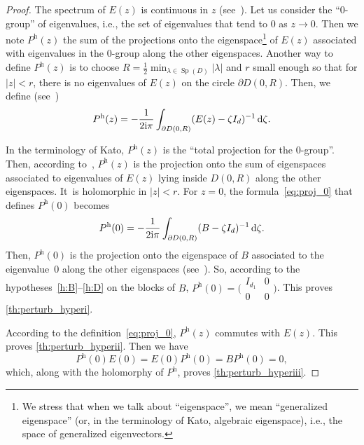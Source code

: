 \documentclass[11pt]{article}
\newcommand{\ie}{i.e.,\xspace}
\theoremstyle{plain}
\theoremstyle{definition}
\theoremstyle{remark}
\DeclareMathOperator{\Sp}{Sp}
\newcommand{\diff}[1][-3]{\ensuremath{\mathop{}\mkern#1mu\mathrm{d}}}
\newcommand{\h}{{\mathrm h}}
\newcommand{\iu}{\mathrm i}
\begin{document}
\begin{proof}
The spectrum of $E(z)$ is continuous in $z$ (see~\cite[Ch.\,II, \S1.2]{kato_1995}). Let us consider the ``$0$-group'' of eigenvalues, \ie the set of eigenvalues that tend to $0$ as $z\to 0$. Then we note $P^\h(z)$ the sum of the projections onto the eigenspace\footnote{We stress that when we talk about ``eigenspace'', we mean ``generalized eigenspace'' (or, in the terminology of Kato, algebraic eigenspace), \ie the space of generalized eigenvectors.} of $E(z)$ associated with eigenvalues in the $0$-group along the other eigenspaces. Another way to define $P^\h(z)$ is to choose $R=\frac12 \min_{\lambda\in\Sp(D)} |\lambda|$ and $r$ small enough so that for $|z|<r$, there is no eigenvalues of $E(z)$ on the circle $\partial D(0,R)$. Then, we define (see~\cite[Ch.\,II, Eq.\,(1.16)]{kato_1995})
\begin{equation}\label{eq:proj_0}
P^\h(z) = -\frac1{2\iu\pi}\int_{\partial D(0,R)} (E(z)-\zeta I_d)^{-1}\diff \zeta.
\end{equation}

In the terminology of Kato, $P^\h(z)$ is the ``total projection for the $0$-group''. Then, according to~\cite[Ch.\,II, \S1.4]{kato_1995}, $P^\h(z)$ is the projection onto the sum of eigenspaces associated to eigenvalues of $E(z)$ lying inside $D(0,R)$ along the other eigenspaces. It~is holomorphic in $|z|<r$. For $z=0$, the formula~\eqref{eq:proj_0} that defines $P^\h(0)$ becomes
\[
P^\h(0) = -\frac1{2\iu\pi}\int_{\partial D(0,R)} (B-\zeta I_d)^{-1}\diff \zeta.
\]
Then, $P^\h(0)$ is the projection onto the eigenspace of $B$ associated to the eigenvalue~$0$ along the other eigenspaces (see~\cite[Ch.\,II, \S1.4]{kato_1995}). So, according to the hypotheses~\eqref{h:B}--\eqref{h:D} on the blocks of $B$, $P^\h(0) = \big(\begin{smallmatrix}I_{d_1}&0\\0&0 \end{smallmatrix} \big)$. This proves \eqref{th:perturb_hyperi}.

According to the definition~\eqref{eq:proj_0}, $P^\h(z)$ commutes with $E(z)$. This proves \eqref{th:perturb_hyperii}. Then we have
\[
P^\h(0)E(0) = E(0)P^\h(0) = BP^\h(0) = 0,
\]
which, along with the holomorphy of $P^\h$, proves \eqref{th:perturb_hyperiii}.
\end{proof}
\end{document}
